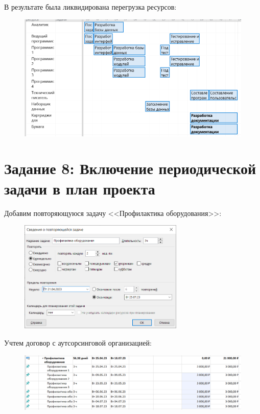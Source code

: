 В результате была ликвидирована перегрузка ресурсов:

\begin{figure}[H]
	\begin{center}
		\includegraphics[width=\textwidth]{imgs/task_7_2.png}
	\end{center}
\end{figure}

\section*{Задание 8: Включение периодической задачи в план проекта}

Добавим повторяющуюся задачу <<Профилактика оборудования>>:

\begin{figure}[H]
	\begin{center}
		\includegraphics[width=0.7\textwidth]{imgs/task_8_0.png}
	\end{center}
\end{figure}

Учтем договор с аутсорсинговой организацией:

\begin{figure}[H]
	\begin{center}
		\includegraphics[width=\textwidth]{imgs/task_8_1.png}
	\end{center}
\end{figure}

